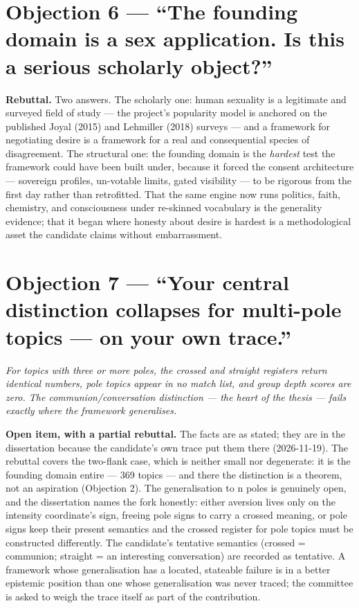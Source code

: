\section{Objection 6 --- ``The founding domain is a sex application. Is
this a serious scholarly
object?''}\label{objection-6-the-founding-domain-is-a-sex-application.-is-this-a-serious-scholarly-object}

\textbf{Rebuttal.} Two answers. The scholarly one: human sexuality is a
legitimate and surveyed field of study --- the project's popularity
model is anchored on the published Joyal (2015) and Lehmiller (2018)
surveys --- and a framework for negotiating desire is a framework for a
real and consequential species of disagreement. The structural one: the
founding domain is the \emph{hardest} test the framework could have been
built under, because it forced the consent architecture --- sovereign
profiles, un-votable limits, gated visibility --- to be rigorous from
the first day rather than retrofitted. That the same engine now runs
politics, faith, chemistry, and consciousness under re-skinned
vocabulary is the generality evidence; that it began where honesty about
desire is hardest is a methodological asset the candidate claims without
embarrassment.

\section{Objection 7 --- ``Your central distinction collapses for
multi-pole topics --- on your own
trace.''}\label{objection-7-your-central-distinction-collapses-for-multi-pole-topics-on-your-own-trace.}

\emph{For topics with three or more poles, the crossed and straight
registers return identical numbers, pole topics appear in no match list,
and group depth scores are zero. The communion/conversation distinction
--- the heart of the thesis --- fails exactly where the framework
generalises.}

\textbf{Open item, with a partial rebuttal.} The facts are as stated;
they are in the dissertation because the candidate's own trace put them
there (2026-11-19). The rebuttal covers the two-flank case, which is
neither small nor degenerate: it is the founding domain entire --- 369
topics --- and there the distinction is a theorem, not an aspiration
(Objection 2). The generalisation to n poles is genuinely open, and the
dissertation names the fork honestly: either aversion lives only on the
intensity coordinate's sign, freeing pole signs to carry a crossed
meaning, or pole signs keep their present semantics and the crossed
register for pole topics must be constructed differently. The
candidate's tentative semantics (crossed = communion; straight = an
interesting conversation) are recorded as tentative. A framework whose
generalisation has a located, stateable failure is in a better epistemic
position than one whose generalisation was never traced; the committee
is asked to weigh the trace itself as part of the contribution.


